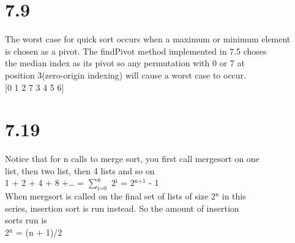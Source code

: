 \documentclass[11pt]{article}
\begin{document}
\section{7.9}
\label{sec:orgbfdc510}
The worst case for quick sort occurs when a maximum or minimum element\\
is chosen as a pivot. The findPivot method implemented in 7.5 choses\\
the median index as its pivot so any permutation with 0 or 7 at\\
position 3(zero-origin indexing) will cause a worst case to occur.\\

[0 1 2 7 3 4 5 6]\\
\section{7.19}
\label{sec:orga9cfe62}
Notice that for n calls to merge sort, you first call mergesort on one\\
list, then two list, then 4 lists and so on\\

1 + 2 + 4 + 8 +\ldots{} = \(\sum_{\text{i=0}}^{\text{n}}\) 2\(^{\text{i}}\) = 2\(^{\text{n+1}}\) - 1\\

When mergsort is called on the final set of lists of size 2\(^{\text{n}}\) in this\\
series, insertion sort is run instead. So the amount of insertion\\
sorts run is\\

2\(^{\text{n}}\) = (n + 1)/2\\
\end{document}
